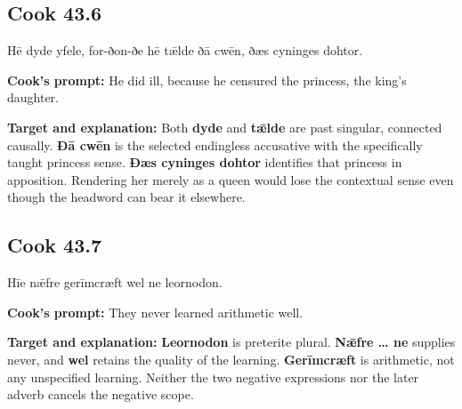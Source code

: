 \par\begin{minipage}{\linewidth}\raggedright
\subsection*{Cook 43.6}

Hē dyde yfele, for-ðon-ðe hē tǣlde ðā cwēn, ðæs cyninges dohtor.

\textbf{Cook's prompt:} He did ill, because he censured the princess, the king’s daughter.

\textbf{Target and explanation:} Both \textbf{dyde} and \textbf{tǣlde} are past singular, connected causally. \textbf{Ðā cwēn} is the selected endingless accusative with the specifically taught princess sense. \textbf{Ðæs cyninges dohtor} identifies that princess in apposition. Rendering her merely as a queen would lose the contextual sense even though the headword can bear it elsewhere.

\end{minipage}\par\addvspace{4pt}

\par\begin{minipage}{\linewidth}\raggedright
\subsection*{Cook 43.7}

Hīe nǣfre gerīmcræft wel ne leornodon.

\textbf{Cook's prompt:} They never learned arithmetic well.

\textbf{Target and explanation:} \textbf{Leornodon} is preterite plural. \textbf{Nǣfre … ne} supplies never, and \textbf{wel} retains the quality of the learning. \textbf{Gerīmcræft} is arithmetic, not any unspecified learning. Neither the two negative expressions nor the later adverb cancels the negative scope.

\end{minipage}\par\addvspace{4pt}

